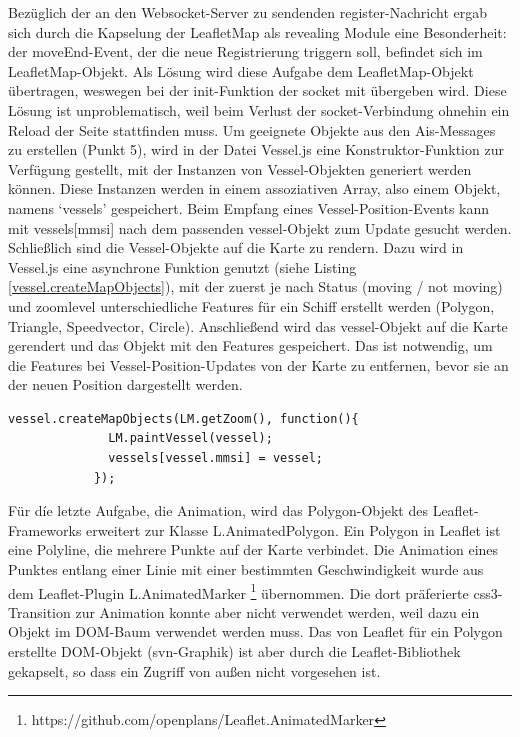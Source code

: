 Bezüglich der an den Websocket-Server zu sendenden register-Nachricht ergab sich durch die Kapselung der LeafletMap als revealing Module eine Besonderheit: der moveEnd-Event, der die neue Registrierung triggern soll, befindet sich im LeafletMap-Objekt. Als Lösung wird diese Aufgabe dem LeafletMap-Objekt übertragen, weswegen bei der init-Funktion der socket mit übergeben wird. Diese Lösung ist unproblematisch, weil beim Verlust der socket-Verbindung ohnehin ein Reload der Seite stattfinden muss.
Um geeignete Objekte aus den Ais-Messages zu erstellen (Punkt 5), wird in der Datei Vessel.js eine Konstruktor-Funktion zur Verfügung gestellt, mit der Instanzen von Vessel-Objekten generiert werden können. Diese Instanzen werden in einem assoziativen Array, also einem Objekt, namens ‘vessels’ gespeichert. Beim Empfang eines Vessel-Position-Events kann mit vessels[mmsi] nach dem passenden vessel-Objekt zum Update gesucht werden.
Schließlich sind die Vessel-Objekte auf die Karte zu rendern. Dazu wird in Vessel.js eine asynchrone Funktion genutzt (siehe Listing \ref{vessel.createMapObjects}), mit der zuerst je nach Status (moving / not moving) und zoomlevel unterschiedliche Features für ein Schiff erstellt werden (Polygon, Triangle, Speedvector, Circle). Anschließend wird das vessel-Objekt auf die Karte gerendert und das Objekt mit den Features gespeichert. Das ist notwendig, um die Features bei Vessel-Position-Updates von der Karte zu entfernen, bevor sie an der neuen Position dargestellt werden.
\begin{lstlisting}[caption=Aufruf der public function createMapObjects des Vessel-Objekts in ais-socket.io.js, label=vessel.createMapObjects]
vessel.createMapObjects(LM.getZoom(), function(){
              LM.paintVessel(vessel);
              vessels[vessel.mmsi] = vessel;
            });
\end{lstlisting}

Für díe letzte Aufgabe, die Animation, wird das Polygon-Objekt des Leaflet-Frameworks erweitert zur Klasse L.AnimatedPolygon. Ein Polygon in Leaflet ist eine Polyline, die mehrere Punkte auf der Karte verbindet. Die Animation eines Punktes entlang einer Linie mit einer bestimmten Geschwindigkeit wurde aus dem Leaflet-Plugin L.AnimatedMarker \footnote{\label{foot:2}https://github.com/openplans/Leaflet.AnimatedMarker} übernommen. Die dort präferierte css3-Transition zur Animation konnte aber nicht verwendet werden, weil dazu ein Objekt im DOM-Baum verwendet werden muss. Das von Leaflet für ein Polygon erstellte DOM-Objekt (svn-Graphik) ist aber durch die Leaflet-Bibliothek gekapselt, so dass ein Zugriff von außen nicht vorgesehen ist.  \\

